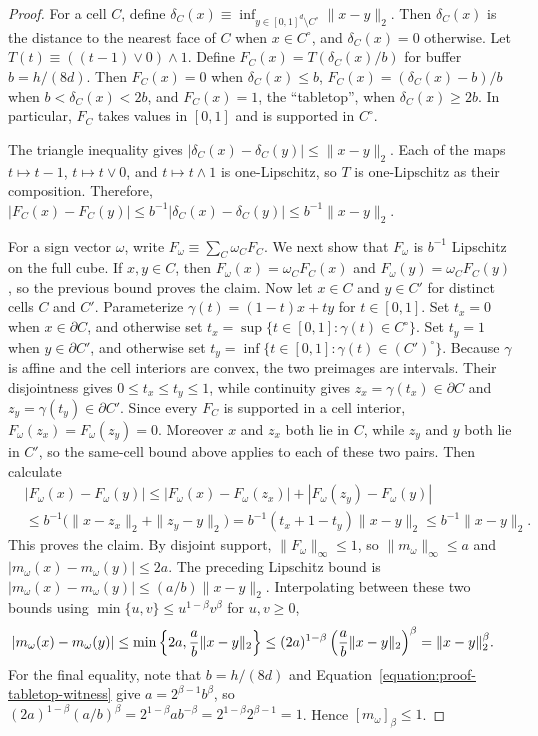 \documentclass[letterpaper,12pt]{article}
\theoremstyle{definition}
\numberwithin{equation}{section}
\begin{document}
\begin{proof}
For a cell $C$, define $\delta_C(x)\equiv\inf_{y\in[0,1]^d\setminus C^\circ}\|x-y\|_2$.
Then $\delta_C(x)$ is the distance to the nearest face of $C$ when $x\in C^\circ$, and $\delta_C(x)=0$ otherwise.
Let $T(t)\equiv((t-1)\vee0)\wedge1$.
Define $F_C(x)=T(\delta_C(x)/b)$ for buffer $b=h/(8d)$.
Then $F_C(x)=0$ when $\delta_C(x)\leq b$, $F_C(x)=(\delta_C(x)-b)/b$ when $b<\delta_C(x)<2b$, and $F_C(x)=1$, the ``tabletop'', when $\delta_C(x)\geq2b$.
In particular, $F_C$ takes values in $[0,1]$ and is supported in $C^\circ$.

The triangle inequality gives $|\delta_C(x)-\delta_C(y)|\leq\|x-y\|_2$.
Each of the maps $t\mapsto t-1$, $t\mapsto t\vee0$, and $t\mapsto t\wedge1$ is one-Lipschitz, so $T$ is one-Lipschitz as their composition.
Therefore, $|F_C(x)-F_C(y)|\leq b^{-1}|\delta_C(x)-\delta_C(y)|\leq b^{-1}\|x-y\|_2$.

For a sign vector $\omega$, write $F_\omega\equiv\sum_C\omega_CF_C$.
We next show that $F_\omega$ is $b^{-1}$ Lipschitz on the full cube.
If $x,y\in C$, then $F_\omega(x)=\omega_CF_C(x)$ and $F_\omega(y)=\omega_CF_C(y)$, so the previous bound proves the claim.
Now let $x\in C$ and $y\in C'$ for distinct cells $C$ and $C'$.
Parameterize $\gamma(t)=(1-t)x+ty$ for $t\in[0,1]$.
Set $t_x=0$ when $x\in\partial C$, and otherwise set $t_x=\sup\{t\in[0,1]:\gamma(t)\in C^\circ\}$.
Set $t_y=1$ when $y\in\partial C'$, and otherwise set $t_y=\inf\{t\in[0,1]:\gamma(t)\in(C')^\circ\}$.
Because $\gamma$ is affine and the cell interiors are convex, the two preimages are intervals.
Their disjointness gives $0\leq t_x\leq t_y\leq1$, while continuity gives $z_x=\gamma(t_x)\in\partial C$ and $z_y=\gamma(t_y)\in\partial C'$.
Since every $F_C$ is supported in a cell interior, $F_\omega(z_x)=F_\omega(z_y)=0$.
Moreover $x$ and $z_x$ both lie in $C$, while $z_y$ and $y$ both lie in $C'$, so the same-cell bound above applies to each of these two pairs.
Then calculate
\begin{align*}
&|F_\omega(x)-F_\omega(y)|\leq|F_\omega(x)-F_\omega(z_x)|+|F_\omega(z_y)-F_\omega(y)|\\
&\leq b^{-1}\bigl(\|x-z_x\|_2+\|z_y-y\|_2\bigr)=b^{-1}(t_x+1-t_y)\|x-y\|_2\leq b^{-1}\|x-y\|_2.
\end{align*}
This proves the claim.
By disjoint support, $\|F_\omega\|_\infty\leq1$, so $\|m_\omega\|_\infty\leq a$ and $|m_\omega(x)-m_\omega(y)|\leq2a$.
The preceding Lipschitz bound is $|m_\omega(x)-m_\omega(y)|\leq(a/b)\|x-y\|_2$.
Interpolating between these two bounds using $\min\{u,v\}\leq u^{1-\beta}v^\beta$ for $u,v\geq0$,
\begin{align}
|m_\omega(x)-m_\omega(y)|&\leq\min\left\{2a,\frac ab\|x-y\|_2\right\}\notag\leq(2a)^{1-\beta}\left(\frac ab\|x-y\|_2\right)^\beta=\|x-y\|_2^\beta.
\end{align}
For the final equality, note that $b=h/(8d)$ and Equation~\eqref{equation:proof-tabletop-witness} give $a=2^{\beta-1}b^\beta$, so $(2a)^{1-\beta}(a/b)^\beta=2^{1-\beta}ab^{-\beta}=2^{1-\beta}2^{\beta-1}=1$.
Hence $[m_\omega]_\beta\leq1$.


\end{proof}
\end{document}
